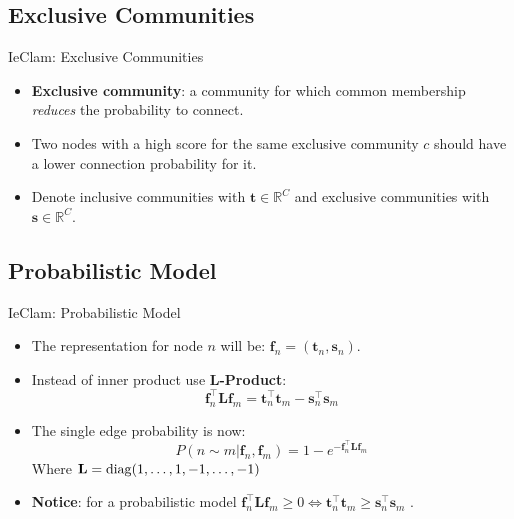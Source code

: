 \documentclass{beamer}
\begin{document}
\subsection{Exclusive Communities}
\begin{frame}{IeClam: Exclusive Communities}
    \begin{itemize}[itemsep=1em, label=\textbullet]
        \item \textbf{Exclusive community}: a community for which common membership \textit{reduces} the probability to connect. 
        \item Two nodes with a high score for the same exclusive community $c$ should have a lower connection probability for it.
        \item Denote inclusive communities with $\mathbf{t} \in \mathbb{R}^C$ and exclusive communities with $\mathbf{s}\in\mathbb{R}^C$.%
    \end{itemize}
\end{frame}

\subsection{Probabilistic Model}
\begin{frame}{IeClam: Probabilistic Model}
    \begin{itemize}[itemsep=1em, label=\textbullet]   
    \item The representation for node $n$ will be: $\mathbf{f}_n = (\mathbf{t}_n, \mathbf{s}_n)$.%
    
    \item Instead of inner product use \textbf{L-Product}: \[\mathbf{f}_n^\top \mathbf{L} \mathbf{f}_m = \mathbf{t}_n^\top \mathbf{t}_m - \mathbf{s}_n^\top \mathbf{s}_m\]
    \item The single edge probability is now:
    \[P(n \sim m| \mathbf{f}_n, \mathbf{f}_m) = 1-e^{-\mathbf{f}_n^\top \mathbf{L} \mathbf{f}_m}\] 
    Where $\mathbf{L} = {\rm diag}(1,\dots, 1, -1, \dots, -1)$ 
    \item \textbf{Notice}: for a probabilistic model $\mathbf{f}_n^\top \mathbf{L} \mathbf{f}_m \geq 0 \iff \mathbf{t}_n^\top \mathbf{t}_m \geq \mathbf{s}_n^\top \mathbf{s}_m$ .
    \end{itemize}
        
    \end{frame}
\end{document}
